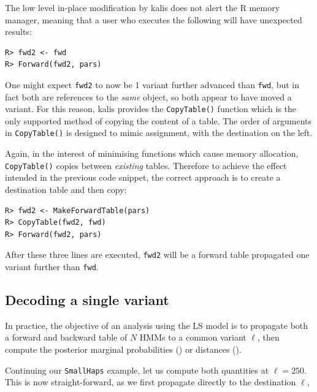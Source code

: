\documentclass[a4paper]{article}
\let\proglang=\textsf
\newcommand{\pkg}[1]{{\fontseries{m}\fontseries{b}\selectfont #1}}
\begin{document}
The low level in-place modification by \pkg{kalis} does not alert the \proglang{R} memory manager, meaning that a user who executes the following will have unexpected results:

\begin{verbatim}
R> fwd2 <- fwd
R> Forward(fwd2, pars)
\end{verbatim}

One might expect \texttt{fwd2} to now be 1 variant further advanced than \texttt{fwd}, but in fact both are references to the \emph{same} object, so both appear to have moved a variant.
For this reason, \pkg{kalis} provides the \texttt{CopyTable()} function which is the only supported method of copying the content of a table.
The order of arguments in \texttt{CopyTable()} is designed to mimic assignment, with the destination on the left.

Again, in the interest of minimising functions which cause memory allocation, \texttt{CopyTable()} copies between \emph{existing} tables.
Therefore to achieve the effect intended in the previous code snippet, the correct approach is to create a destination table and then copy:

\begin{verbatim}
R> fwd2 <- MakeForwardTable(pars)
R> CopyTable(fwd2, fwd)
R> Forward(fwd2, pars)
\end{verbatim}

After these three lines are executed, \texttt{fwd2} will be a forward table propagated one variant further than \texttt{fwd}.



\subsection*{Decoding a single variant}
\label{decoding-a-single-variant}

In practice, the objective of an analysis using the LS model is to propagate both a forward and backward table of \(N\) HMMs to a common variant \(\ell\), then compute the posterior marginal probabilities () or distances ().

Continuing our \texttt{SmallHaps} example, let us compute both quantities at \(\ell=250\).
This is now straight-forward, as we first propagate directly to the destination \(\ell\),
\end{document}
